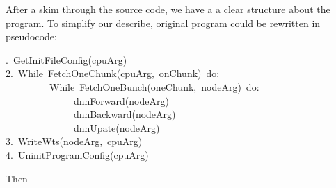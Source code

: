 \documentclass{article}
\begin{document}
After a skim through the source code, we have a a clear structure 
about the program. To simplify our describe, original program 
could be rewritten in pseudocode:%
\begin{mdpre}%
.~{GetInitFileConfig}(cpuArg)\\
{2}.~{While}~{FetchOneChunk}(cpuArg,~onChunk)~{do}:\\
~~~~~~~~~{While}~{FetchOneBunch}(oneChunk,~nodeArg)~{do}:\\
~~~~~~~~~~~~~~dnnForward(nodeArg)\\
~~~~~~~~~~~~~~dnnBackward(nodeArg)\\
~~~~~~~~~~~~~~dnnUpate(nodeArg)\\
{3}.~{WriteWts}(nodeArg,~cpuArg)\\
{4}.~{UninitProgramConfig}(cpuArg)\\
\end{mdpre}\noindent{}Then%
\end{document}
